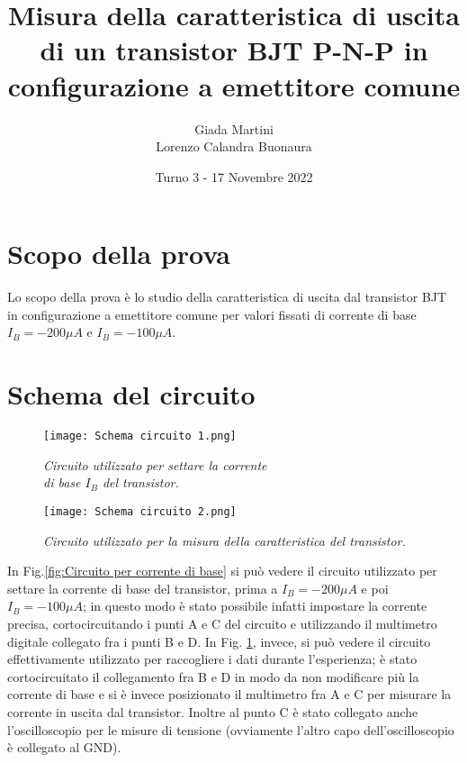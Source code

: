 \documentclass[a4paper, 11pt]{article}
\title{\textbf{Misura della caratteristica di uscita di un transistor BJT P-N-P in configurazione a emettitore comune}}
\author{Giada Martini \\ Lorenzo Calandra Buonaura}
\date{Turno 3 - 17 Novembre 2022}
\begin{document}
\maketitle

\section{Scopo della prova}
Lo scopo della prova è lo studio della caratteristica di uscita dal transistor BJT in configurazione a emettitore comune per valori fissati di corrente di base $I_B = -200 \mu A $ e $I_B = -100 \mu A$. 

\section{Schema del circuito}
\begin{figure}[!ht]
  \centering
  \begin{minipage}[b]{0.51\textwidth}
    \texttt{[image: Schema circuito 1.png]}
    \caption{\textit{Circuito utilizzato per settare la corrente \\ di base $I_B$ del transistor.}}
    \label{fig:Circuito per corrente di base}
  \end{minipage}
  \hfill
  \begin{minipage}[b]{0.48\textwidth}
    \texttt{[image: Schema circuito 2.png]}
    \caption{\textit{Circuito utilizzato per la misura della caratteristica del transistor.}}
    \label{fig:Circuito utilizzato per la prova}
  \end{minipage}
\end{figure}

In Fig.\ref{fig:Circuito per corrente di base} si può vedere il circuito utilizzato per settare la corrente di base del transistor, prima a $I_B = -200 \mu A $ e poi $I_B = -100 \mu A$; in questo modo è stato possibile infatti impostare la corrente precisa, cortocircuitando i punti A e C del circuito e utilizzando il multimetro digitale collegato fra i punti B e D. In Fig. \ref{fig:Circuito utilizzato per la prova}, invece, si può vedere il circuito effettivamente utilizzato per raccogliere i dati durante l'esperienza; è stato cortocircuitato il collegamento fra B e D in modo da non modificare più la corrente di base e si è invece posizionato il multimetro fra A e C per misurare la corrente in uscita dal transistor. Inoltre al punto C è stato collegato anche l'oscilloscopio per le misure di tensione (ovviamente l'altro capo dell'oscilloscopio è collegato al GND).
\end{document}
